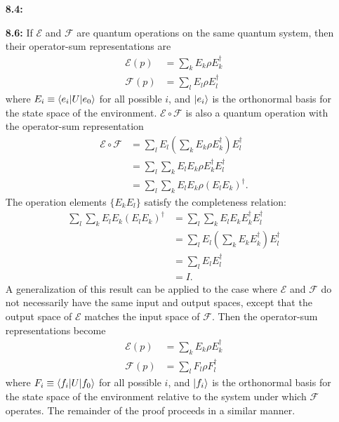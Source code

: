 \documentclass[a4paper,12pt]{article}
\begin{document}
\begin{enumerate}
    \item[\textbf{8.4:}]

    \item[\textbf{8.6:}]
        If $\mathcal{E}$ and $\mathcal{F}$ are quantum operations on the same quantum system, then their operator-sum representations are
        \begin{align*}
            \mathcal{E}(p) &= \sum_k E_k \rho E_k^\dagger \\
            \mathcal{F}(p) &= \sum_l E_l \rho E_l^\dagger
        \end{align*}
        where $E_i \equiv \braket{e_i|U}{e_0}$ for all possible $i$, and $\ket{e_i}$ is the orthonormal basis for the state space of the environment. $\mathcal{E} \circ \mathcal{F}$ is also a quantum operation with the operator-sum representation
        \begin{align*}
            \mathcal{E} \circ \mathcal{F} &= \sum_l E_l (\sum_k E_k \rho E_k^\dagger) E_l^\dagger \\
            &= \sum_l \sum_k E_l E_k \rho E_k^\dagger E_l^\dagger \\
            &= \sum_l \sum_k E_l E_k \rho (E_l E_k)^\dagger.
        \end{align*}
        The operation elements $\{ E_k E_l \}$ satisfy the completeness relation:
        \begin{align*}
            \sum_l \sum_k E_l E_k (E_l E_k)^\dagger &= \sum_l \sum_k E_l E_k E_k^\dagger E_l^\dagger \\
            &= \sum_l E_l (\sum_k E_k E_k^\dagger) E_l^\dagger \\
            &= \sum_l E_l E_l^\dagger \\
            &= I.
        \end{align*}
        A generalization of this result can be applied to the case where $\mathcal{E}$ and $\mathcal{F}$ do not necessarily have the same input and output spaces, except that the output space of $\mathcal{E}$ matches the input space of $\mathcal{F}$. Then the operator-sum representations become
        \begin{align*}
            \mathcal{E}(p) &= \sum_k E_k \rho E_k^\dagger \\
            \mathcal{F}(p) &= \sum_l F_l \rho F_l^\dagger
        \end{align*}
        where $F_i \equiv \braket{f_i|U}{f_0}$ for all possible $i$, and $\ket{f_i}$ is the orthonormal basis for the state space of the environment relative to the system under which $\mathcal{F}$ operates. The remainder of the proof proceeds in a similar manner.

\end{enumerate}
\end{document}
